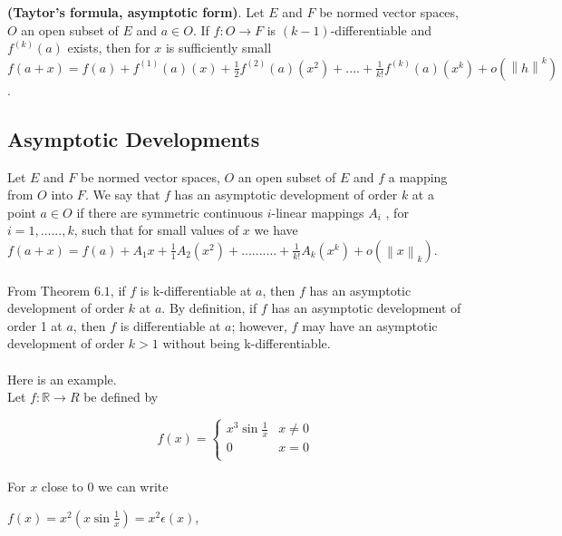 \documentclass[11 pt]{article}
\theoremstyle{definition}
\theoremstyle{remark}
\newcommand{\R}{\mathbb{R}}
\newcommand\norm[1]{\left\lVert#1\right\rVert}
\begin{document}
\theorem \textbf{(Taytor's formula, asymptotic form)}. Let $E$ and $F$ be normed vector spaces, $O$ an open subset of $E$ and $a \in O$. If $f: O \to F$ is $(k-1)$-differentiable and $f^{(k)}(a)$ exists, then for $x$ is sufficiently small \\
\qquad $ f(a+x) = f(a)  + f^{(1)}(a)(x) + \frac{1}{2} f^{(2)}(a)(x^2) +....+\frac{1}{k!} f^{(k)}(a)(x^k) + o(\norm{h}^k)$.

\newpage

\subsection{Asymptotic Developments}
\normalfont

Let $E$ and $F$ be normed vector spaces, $O$ an open subset of $E$ and $f$ a mapping from $O$ into $F$. We say that $f$ has an asymptotic development of order $k$ at a point $a \in O$ if there are symmetric continuous $i$-linear mappings $A_i$ , for $i = 1,......,k$,
such that for small values of $x$ we have\\

\hspace{2cm} $f(a+x) = f(a) + A_1x + \frac{1}{1}A_2(x^2)+..........+ \frac{1}{k!}A_k(x^k) + o(\norm{x}_k)$.\\~\\


From Theorem $6.1$, if $f$ is k-differentiable at $a$, then $f$ has an asymptotic development of order $k$ at $a$. By definition, if $f$ has an asymptotic development of order 1 at $a$, then $f$ is differentiable at $a$; however, $f$ may have an asymptotic development of order $k > 1$ without being k-differentiable.\\~\\

Here is an example.\\ 
Let $f : \R \to R$ be defined by

\hspace*{3cm}  \[ f(x) = \begin{cases} 
							 x^3 \sin \frac{1}{x} & x \neq 0 \\
							 0 & x = 0\\
							 \end{cases}
							 \]
\\
For $x$ close to $0$ we can write


\hspace*{3cm} $f(x) = x^2 ( x \sin \frac{1}{x}) = x^2 \epsilon(x)$,\\
\end{document}
